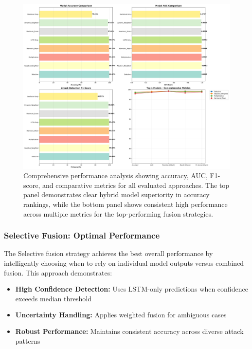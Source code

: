 \documentclass[conference]{IEEEtran}
\begin{document}
\begin{figure}[!t]
\centering
\includegraphics[width=\columnwidth]{comprehensive_hybrid_results.png}
\caption{Comprehensive performance analysis showing accuracy, AUC, F1-score, and comparative metrics for all evaluated approaches. The top panel demonstrates clear hybrid model superiority in accuracy rankings, while the bottom panel shows consistent high performance across multiple metrics for the top-performing fusion strategies.}
\label{fig:comprehensive_results}
\end{figure}

\subsubsection{Selective Fusion: Optimal Performance}
The Selective fusion strategy achieves the best overall performance by intelligently choosing when to rely on individual model outputs versus combined fusion. This approach demonstrates:
\begin{itemize}
    \item \textbf{High Confidence Detection:} Uses LSTM-only predictions when confidence exceeds median threshold
    \item \textbf{Uncertainty Handling:} Applies weighted fusion for ambiguous cases
    \item \textbf{Robust Performance:} Maintains consistent accuracy across diverse attack patterns
\end{itemize}
\end{document}
